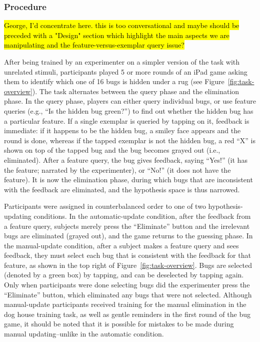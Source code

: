\documentclass[10pt,letterpaper]{article}
\begin{document}
\subsubsection{Procedure}

\hl{George, I'd concentrate here.  this is too conversational and maybe
should be preceded with a "Design" section which highlight the main
aspects we are manipulating and the feature-versus-exemplar query issue?}

After being trained by an experimenter on a simpler version of the task with 
unrelated stimuli, participants played 5 or more 
rounds of an iPad game asking them to identify which one of 16 bugs is hidden 
under a rug (see Figure~\ref{fig:task-overview}). The task alternates between the 
query phase and the elimination phase. In the query phase, players can either query 
individual bugs, or use feature queries (e.g., ``Is the hidden bug green?'') to find out 
whether the hidden bug has a particular feature. If a single exemplar is queried by 
tapping on it, feedback is immediate: if it happens to be the hidden bug, a smiley 
face appears and the round is done, whereas if the tapped exemplar is not the 
hidden bug, a red ``X'' is shown on top of the tapped bug and the bug becomes 
grayed out (i.e., eliminated). After a feature query, the bug gives feedback, saying 
``Yes!'' (it has the feature; narrated by the experimenter), or ``No!'' (it does not have 
the feature). It is now the elimination phase, during which bugs that are inconsistent 
with the feedback are eliminated, and the hypothesis space is thus narrowed. 

Participants were assigned in counterbalanced order to one of two hypothesis-
updating conditions. In the automatic-update condition, after the feedback from a 
feature query, subjects merely press the ``Eliminate'' button and the irrelevant bugs 
are eliminated (grayed out), and the game returns to the guessing phase. In the 
manual-update condition, after a subject makes a feature query and sees feedback, 
they must select each bug that is consistent with the feedback for that feature, as 
shown in the top right of Figure~\ref{fig:task-overview}. Bugs are selected (denoted by a green box) by 
tapping, and can be deselected by tapping again. Only when participants were done 
selecting bugs did the experimenter press the ``Eliminate'' button, which eliminated 
any bugs that were not selected. Although manual-update participants received 
training for the manual elimination in the dog house training task, as well as gentle 
reminders in the first round of the bug game, it should be noted that it is possible for 
mistakes to be made during manual updating--unlike in the automatic condition.
\end{document}

